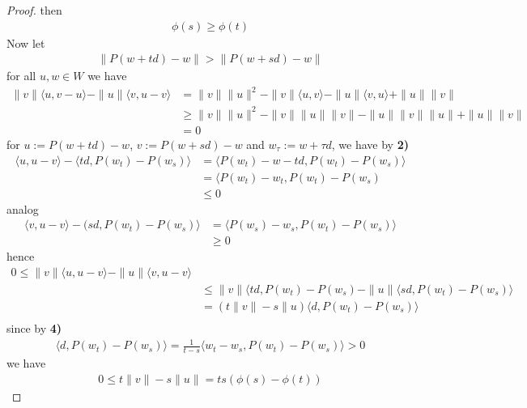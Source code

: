 \begin{proof}
	then
	\begin{align*}
		\phi(s) \geq \phi(t)
	\end{align*}
	Now let
		\begin{align*}
		\|P(w + td) - w\| > \|P(w + sd) - w\|
	\end{align*}
	for all $u, w \in W$ we have
	\begin{align*}
		\|v\| \langle u, v - u\rangle - \|u\| \langle v, u - v \rangle
		&= \|v\|\|u\|^2 - \|v\| \langle u, v\rangle - \|u\| \langle v, u\rangle + \|u\| \|v\|\\
		&\geq \|v\| \|u\|^2 - \|v\| \|u\| \|v\| - \|u\|\|v\|\|u\| + \|u\|\|v\|\\
		&= 0
	\end{align*}
	for $u:= P(w + td) - w$, $v := P(w + sd) - w$ and $w_\tau := w + \tau d$, we have by \textbf{2)}
	\begin{align*}
		\langle u, u - v\rangle - \langle td, P(w_t) - P(w_s)\rangle
		&= \langle P(w_t) - w - td, P(w_t) - P(w_s) \rangle\\
		&= \langle P(w_t) - w_t, P(w_t) - P(w_s) \\
		&\le 0
	\end{align*}
	analog
	\begin{align*}
		\langle v, u - v \rangle - (sd, P(w_t) - P(w_s) \rangle
		&= \langle P(w_s) - w_s, P(w_t) - P(w_s) \rangle \\
		&\ge 0
	\end{align*}
	hence
	\begin{align*}
		0 \le \|v\|\langle u , u - v \rangle - \|u\| \langle v, u - v \rangle\\
		&\le \|v\| \langle td, P(w_t) - P(w_s) - \|u\|\langle sd, P(w_t) - P(w_s) \rangle \\
		&= ( t \|v\| - s \|u )\langle d, P(w_t) - P(w_s) \rangle \\
	\end{align*}
	since by \textbf{4)}
	\begin{align*}
		\langle d, P(w_t) - P(w_s) \rangle = \frac{1}{t - s} \langle w_t - w_s, P(w_t) - P(w_s) \rangle > 0
	\end{align*}
	we have
	\begin{align*}
		0 \le t\|v\| - s \|u\| = ts (\phi(s) - \phi(t))
	\end{align*}
\end{proof}


